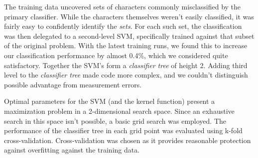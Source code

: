 \documentclass{netsec2012}
\begin{document}
The training data uncovered sets of characters commonly misclassified by the primary classifier. 
While the characters themselves weren't easily classified, it was fairly easy to confidently 
identify the \emph{sets}.  For each such set, the classification was then delegated to a 
second-level SVM, specifically trained against that subset of the original problem.  With the 
latest training runs, we found this to increase our classification performance by almost 0.4\%, 
which we considered quite satisfactory. Together the SVM's form a \emph{classifier tree} of 
height 2. Adding third level to the \emph{classifier tree} made code more complex, and we couldn't
distinguish possible advantage from measurement errors.

Optimal parameters for the SVM (and the kernel function) present a maximization problem in a
2-dimensional search space.  Since an exhaustive search in this space isn't possible,
a basic grid search was employed.  The performance of the classifier tree in each grid point
was evaluated using k-fold cross-validation.  Cross-validation was chosen as it provides
reasonable protection against overfitting against the training data.

\end{document}
